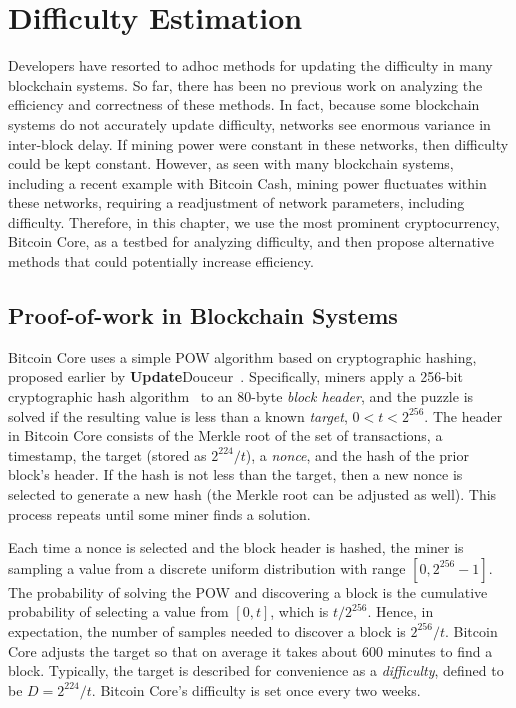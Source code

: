 \chapter{Difficulty Estimation}
\label{difficulty-estimation}

Developers have resorted to adhoc methods for updating the difficulty in many blockchain systems. So far, there has been no previous work on analyzing the efficiency and correctness of these methods. In fact, because some blockchain systems do not accurately update difficulty, networks see enormous variance in inter-block delay. If mining power were constant in these networks, then difficulty could be kept constant. However, as seen with many blockchain systems, including a recent example with Bitcoin Cash, mining power fluctuates within these networks, requiring a readjustment of network parameters, including difficulty. Therefore, in this chapter, we use the most prominent cryptocurrency, Bitcoin Core, as a testbed for analyzing difficulty, and then propose alternative methods that could potentially increase efficiency. 

\section{Proof-of-work in Blockchain Systems}
Bitcoin Core uses a simple POW algorithm based on cryptographic
hashing, proposed earlier by \textbf{Update}Douceur~\cite{Douceur:2002}.
Specifically, miners apply a 256-bit cryptographic hash algorithm~\cite{hashcash} to
an 80-byte {\em block header}, and the puzzle is solved if the
resulting value is less than a known {\em target}, $0<t<2^{256}$. The
header in Bitcoin Core consists of the Merkle root of the set of
transactions, a timestamp, the target (stored as $2^{224}/t$), a {\em
  nonce}, and the hash of the prior block's header. If the hash is not
less than the target, then a new nonce is selected to generate a new
hash (the Merkle root can be adjusted as well). This process repeats
until some miner finds a solution.
  
Each time a nonce is selected and the block
header is hashed, the miner is sampling a value from a discrete uniform
distribution with range $[0,2^{256}-1]$. The probability of solving the POW and
discovering a block is the cumulative probability of selecting a value
from $[0,t]$, which is $t/{2^{256}}$. Hence, in expectation, the
number of samples needed to discover a block is ${2^{256}/t}$. Bitcoin Core
adjusts the target so that on average it takes about 600 minutes to
find a block. Typically, the target is described for convenience as a
{\em difficulty}, defined to be $D=2^{224}/t$. Bitcoin Core's difficulty
is set once every two weeks.

